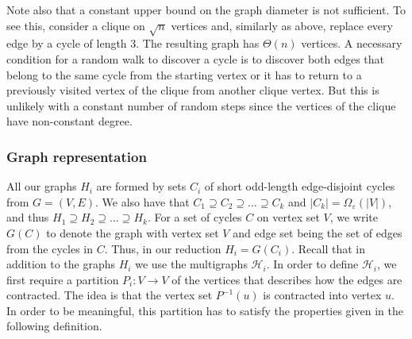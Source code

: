\documentclass[11pt]{article}
\newcommand{\eps}{\ensuremath{\epsilon}}
\def\epsilon{\ensuremath{\varepsilon}}
\begin{document}
Note also that a constant upper bound on the graph diameter is not sufficient. To see this, consider a clique on $\sqrt{n}$ vertices and, similarly as above, replace every edge by a cycle of length $3$. The resulting graph has $\Theta(n)$ vertices. A necessary condition for a random walk to discover a cycle is to discover both edges that belong to the same cycle from the starting vertex or it has to return to a previously visited vertex of the clique from another clique vertex. But this is unlikely with a constant number of random steps since the vertices of the clique have non-constant degree.



\subsubsection{Graph representation}
\label{subsec:graph-repr}

All our graphs $H_i$ are formed by sets $C_i$ of short odd-length edge-disjoint cycles from $G=(V,E)$. We also have that $C_1 \supseteq C_2 \supseteq \dots \supseteq C_k$ and $|C_k| = \Omega_{\eps}(|V|)$, and thus $H_1 \supseteq H_2 \supseteq \dots \supseteq H_k$. For a set of cycles $C$ on vertex set $V$, we write $G(C)$ to denote the graph with vertex set $V$ and edge set being the set of edges from the cycles in $C$. Thus, in our reduction $H_i = G(C_i)$. Recall that in addition to the graphs $H_i$ we use the multigraphs $\mathcal H_i$. In order to define $\mathcal H_i$, we first require a partition $P_i:V \rightarrow V$ of the vertices that describes how the edges are contracted. The idea is that the vertex set $P^{-1}(u)$ is contracted into vertex $u$. In order to be meaningful, this partition has to satisfy the properties given in the following definition.
\end{document}
